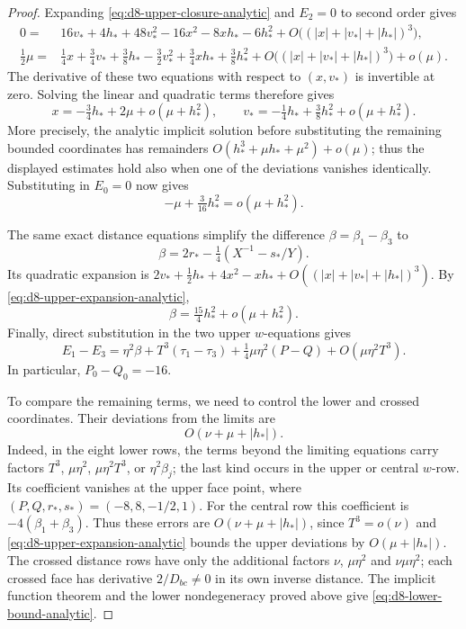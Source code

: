 \documentclass[11pt]{amsart}
\theoremstyle{definition}
\theoremstyle{remark}
\begin{document}
{\begin{proof}
Expanding \eqref{eq:d8-upper-closure-analytic} and $E_2=0$ to second order gives
\begin{align*}
0={}&16v_*+4h_*+48v_*^2-16x^2-8xh_*-6h_*^2
 +O\bigl((|x|+|v_*|+|h_*|)^3\bigr),\\
\tfrac12\mu={}&\tfrac14x+\tfrac34v_*+\tfrac38h_*
 -\tfrac32v_*^2+\tfrac34xh_*+\tfrac38h_*^2
 +O\bigl((|x|+|v_*|+|h_*|)^3\bigr)+o(\mu).
\end{align*}
The derivative of these two equations with respect to $(x,v_*)$ is invertible
at zero. Solving the linear and quadratic terms therefore gives
\begin{equation}\label{eq:d8-upper-expansion-analytic}
x=-\tfrac34h_*+2\mu+o(\mu+h_*^2),\qquad
v_*=-\tfrac14h_*+\tfrac38h_*^2+o(\mu+h_*^2).
\end{equation}
More precisely, the analytic implicit solution before substituting the
remaining bounded coordinates has remainders
$O(h_*^3+\mu h_*+\mu^2)+o(\mu)$; thus the displayed estimates hold also
when one of the deviations vanishes identically.
Substituting in $E_0=0$ now gives
\begin{equation}\label{eq:d8-row0-analytic}
-\mu+\tfrac3{16}h_*^2=o(\mu+h_*^2).
\end{equation}

The same exact distance equations simplify the difference
$\beta=\beta_1-\beta_3$ to
\[
\beta=2r_*-\tfrac14(X^{-1}-s_*/Y).
\]
Its quadratic expansion is
$2v_*+\tfrac12h_*+4x^2-xh_*+O((|x|+|v_*|+|h_*|)^3)$.
By \eqref{eq:d8-upper-expansion-analytic},
\begin{equation}\label{eq:d8-beta-analytic}
\beta=\tfrac{15}{4}h_*^2+o(\mu+h_*^2).
\end{equation}
Finally, direct substitution in the two upper $w$-equations gives
\begin{equation}\label{eq:d8-w-difference-analytic}
E_1-E_3=\eta^2\beta+T^3(\tau_1-\tau_3)
 +\tfrac14\mu\eta^2(P-Q)+O(\mu\eta^2T^3).
\end{equation}
In particular, $P_0-Q_0=-16$.

To compare the remaining terms, we need to control the lower and crossed
coordinates.  Their deviations from the limits are
\begin{equation}\label{eq:d8-lower-bound-analytic}
O(\nu+\mu+|h_*|).
\end{equation}
Indeed, in the eight lower rows, the terms beyond the limiting equations carry
factors $T^3$, $\mu\eta^2$, $\mu\eta^2T^3$, or $\eta^2\beta_j$;
the last kind occurs in the upper or central $w$-row. Its coefficient
vanishes at the upper face point, where $(P,Q,r_*,s_*)=(-8,8,-1/2,1)$.
For the central row this coefficient is $-4(\beta_1+\beta_3)$.
Thus these errors are $O(\nu+\mu+|h_*|)$, since $T^3=o(\nu)$ and
\eqref{eq:d8-upper-expansion-analytic} bounds the upper deviations by
$O(\mu+|h_*|)$. The crossed distance rows have only the additional factors
$\nu$, $\mu\eta^2$ and $\nu\mu\eta^2$; each crossed face has derivative
$2/D_{bc}\ne0$ in its own inverse distance. The implicit function theorem
and the lower nondegeneracy proved above give
\eqref{eq:d8-lower-bound-analytic}.


\end{proof}}
\end{document}
